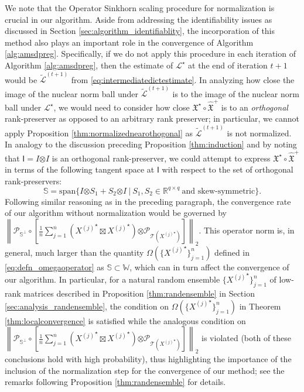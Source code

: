 \documentclass[11pt,letterpaper]{article}
\newcommand{\R}{\mathbb{R}}
\renewcommand{\L}{\mathcal{L}}
\newcommand{\botimes}{\boldsymbol \otimes}
\newcommand{\ct}{\mathcal{T}}
\newcommand{\cp}{\mathcal{P}}
\newcommand{\xx}{\mathfrak{X}}
\newcommand{\sfi}{\mathsf{I}}
\begin{document}
We note that the Operator Sinkhorn scaling procedure for normalization is crucial in our algorithm.  Aside from addressing the identifiability issues as discussed in Section \ref{sec:algorithm_identifiablity}, the incorporation of this method also plays an important role in the convergence of Algorithm \ref{alg:amsdpreg}.  Specifically, if we do not apply this procedure in each iteration of Algorithm \ref{alg:amsdpreg}, then the estimate of $\L^\star$ at the end of iteration $t+1$ would be $\tilde{\L}^{(t+1)}$ from \eqref{eq:intermediatedictestimate}.  In analyzing how close the image of the nuclear norm ball under $\tilde{\L}^{(t+1)}$ is to the image of the nuclear norm ball under $\L^\star$, we would need to consider how close $\xx^\star \circ \hat{\xx}^+$ is to an \emph{orthogonal} rank-preserver as opposed to an arbitrary rank preserver; in particular, we cannot apply Proposition \ref{thm:normalizednearothogonal} as $\tilde{\L}^{(t+1)}$ is not normalized.  In analogy to the discussion preceding Proposition \ref{thm:induction} and by noting that $\sfi = I \botimes I$ is an orthogonal rank-preserver, we could attempt to express $\xx^\star \circ \hat{\xx}^+$ in terms of the following tangent space at $\sfi$ with respect to the set of orthogonal rank-preservers:
\begin{equation} \label{eq:defn_subspacekronskewsym}
\mathbb{S} = \mathrm{span}\{I \botimes S_1 + S_2 \botimes I ~|~ S_1, S_2 \in \R^{q \times q} ~\text{and skew-symmetric}\}.
\end{equation}
Following similar reasoning as in the preceding paragraph, the convergence rate of our algorithm without normalization would be governed by $\left\|\cp_{\mathbb{S}^\perp} \circ \left[\frac{1}{n} \sum_{j=1}^n \left({X^{(j)}}^\star \boxtimes {X^{(j)}}^\star \right) \botimes \cp_{\ct({X^{(j)}}^\star)} \right] \right\|_2$.  This operator norm is, in general, much larger than the quantity $\Omega(\{{X^{(j)}}^\star\}_{j=1}^n)$ defined in \eqref{eq:defn_omegaoperator} as $\mathbb{S} \subset \mathbb{W}$, which can in turn affect the convergence of our algorithm.  In particular, for a natural random ensemble $\{{X^{(j)}}^\star\}_{j=1}^n$ of low-rank matrices described in Proposition \ref{thm:randensemble} in Section \ref{sec:analysis_randensemble}, the condition on $\Omega(\{{X^{(j)}}^\star\}_{j=1}^n)$ in Theorem \ref{thm:localconvergence} is satisfied while the analogous condition on $\left\|\cp_{\mathbb{S}^\perp} \circ \left[\frac{1}{n} \sum_{j=1}^n \left({X^{(j)}}^\star \boxtimes {X^{(j)}}^\star \right) \botimes \cp_{\ct({X^{(j)}}^\star)} \right] \right\|_2$ is violated (both of these conclusions hold with high probability), thus highlighting the importance of the inclusion of the normalization step for the convergence of our method; see the remarks following Proposition \ref{thm:randensemble} for details.
\end{document}
